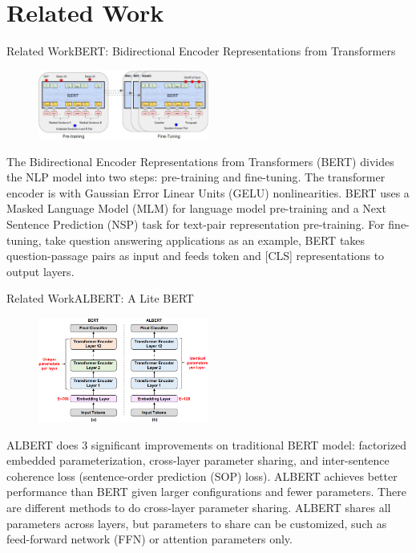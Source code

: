 \documentclass[12pt]{beamer}
\begin{document}
\section{Related Work}
\begin{frame}{Related Work}{BERT: Bidirectional Encoder Representations from Transformers}
\begin{figure}[H]
    \centering
    \includegraphics[width=0.5\textwidth]{BERT.png}
\end{figure}
\small The Bidirectional Encoder Representations from Transformers (BERT) \cite{devlin2019bert} divides the NLP model into two steps: pre-training and fine-tuning. The transformer encoder is with Gaussian Error Linear Units (GELU) nonlinearities. BERT uses a Masked Language Model (MLM) for language model pre-training and a Next Sentence Prediction (NSP) task for text-pair representation pre-training. For fine-tuning, take question answering applications as an example, BERT takes question-passage pairs as input and feeds token and \textsf{[CLS]} representations to output layers.
\end{frame}
\begin{frame}{Related Work}{ALBERT: A Lite BERT}
\begin{figure}[H]
    \centering
    \includegraphics[width=0.5\textwidth]{ALBERT.png}
\end{figure}
\footnotesize ALBERT \cite{lan2020albert} does 3 significant improvements on traditional BERT model: factorized embedded parameterization, cross-layer parameter sharing, and inter-sentence coherence loss (sentence-order prediction (SOP) loss). ALBERT achieves better performance than BERT given larger configurations and fewer parameters. There are different methods to do cross-layer parameter sharing. ALBERT shares all parameters across layers, but parameters to share can be customized, such as feed-forward network (FFN) or attention parameters only.
\end{frame}
\end{document}
